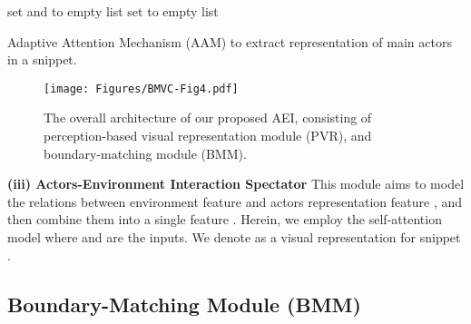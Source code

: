 \documentclass{bmvc2k}
\begin{document}
\begin{algorithm}[t]
\footnotesize
\DontPrintSemicolon
\SetNoFillComment
{}
set  and  to empty list 
set  to empty list 


\caption{Adaptive Attention Mechanism (AAM) to extract representation of main actors in a snippet.}
\label{algo:aam}
\end{algorithm}





\begin{figure*}[t]
\centering
  \texttt{[image: Figures/BMVC-Fig4.pdf]}
  \vspace*{-0.1cm}
  \caption{The overall architecture of our proposed AEI, consisting of perception-based visual representation module (PVR), and boundary-matching module (BMM). }
  \vspace*{-0.4cm}
  \label{full_architecture}
\end{figure*}






\vspace{0.2cm}
\textbf{(iii) Actors-Environment Interaction Spectator}
This module aims to model the relations between environment feature  and actors representation feature , and then combine them into a single feature . Herein, we employ the self-attention model \cite{attention_is_all_you_need} where  and  are the inputs. We denote  as a visual representation for snippet .





\subsection{Boundary-Matching Module (BMM)}
\label{subsec:bmm}
\end{document}
